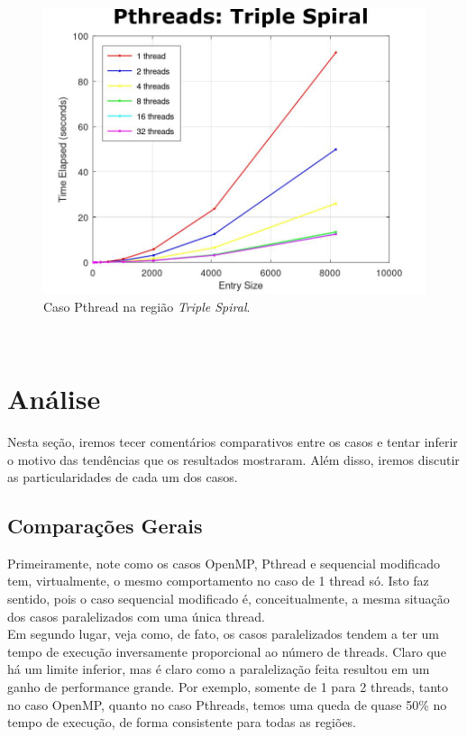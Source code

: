\documentclass[a4paper, 12pt]{article}
\begin{document}
\begin{figure}[H]
	\centering
	\includegraphics[scale=0.45]{pth_triple_spiral}
	\caption{Caso Pthread na região \textit{Triple Spiral}.}
\end{figure}
\hfill\\

\section{Análise}

Nesta seção, iremos tecer comentários comparativos entre os casos e tentar inferir o motivo das tendências que os resultados mostraram. Além disso, iremos discutir as particularidades de cada um dos casos.\\

\subsection{Comparações Gerais}

Primeiramente, note como os casos OpenMP, Pthread e sequencial modificado tem, virtualmente, o mesmo comportamento no caso de 1 thread só. Isto faz sentido, pois o caso sequencial modificado é, conceitualmente, a mesma situação dos casos paralelizados com uma única thread.\\

Em segundo lugar, veja como, de fato, os casos paralelizados tendem a ter um tempo de execução inversamente proporcional ao número de threads. Claro que há um limite inferior, mas é claro como a paralelização feita resultou em um ganho de performance grande. Por exemplo, somente de 1 para 2 threads, tanto no caso OpenMP, quanto no caso Pthreads, temos uma queda de quase 50\% no tempo de execução, de forma consistente para todas as regiões.\\
\end{document}
